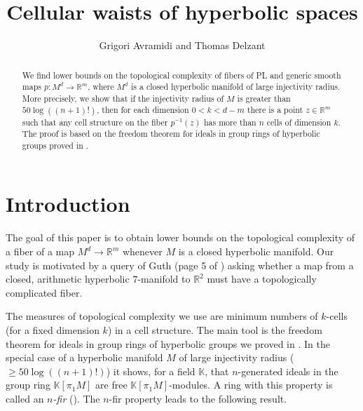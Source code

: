 \documentclass[11pt,letterpaper]{amsart}
\title{Cellular waists of hyperbolic spaces}
\author{Grigori Avramidi and Thomas Delzant}
\begin{document}
\begin{abstract}
We find lower bounds on the topological complexity of fibers of PL and generic smooth maps $p:M^d\rightarrow\mathbb R^m$, where $M^d$ is a closed hyperbolic manifold of large injectivity radius. More precisely, we show that if the injectivity radius of $M$ is greater than $50\log((n+1)!)$, then for each dimension $0<k<d-m$ there is a point $z\in\mathbb R^m$ such that any cell structure on the fiber $p^{-1}(z)$ has more than $n$ cells of dimension $k$. The proof is based on the freedom theorem for ideals in group rings of hyperbolic groups proved in \cite{avramididelzanthyperbolic}.


\end{abstract}

\maketitle
\section{Introduction}
The goal of this paper is to obtain lower bounds on the topological complexity of a fiber of a map $M^d\rightarrow \mathbb R^m$ whenever $M$ is a closed hyperbolic manifold. Our study is motivated by a query of Guth (page 5 of \cite{guthwaist}) asking whether a map from a closed, arithmetic hyperbolic $7$-manifold to $\mathbb R^2$ must have a topologically complicated fiber. 


The measures of topological complexity we use are minimum numbers of $k$-cells (for a fixed dimension $k$) in a cell structure. The main tool is the freedom theorem for ideals in group rings of hyperbolic groups we proved in \cite{avramididelzanthyperbolic}. In the special case of a %
hyperbolic manifold $M$ of large injectivity radius ($\geq 50\log((n+1)!)$) it shows, for a field $\mathbb K$, that $n$-generated ideals in the group ring $\mathbb K[\pi_1M]$ are free $\mathbb K[\pi_1M]$-modules. A ring with this property is called an {\it $n$-fir} (\cite{cohnbook}). %
The $n$-fir property leads to the following result.
\end{document}
